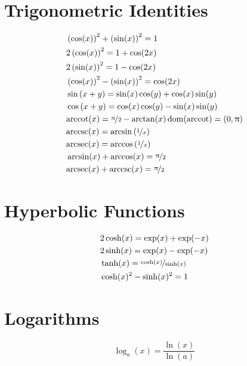 \documentclass[letterpaper,landscape,9pt,fleqn]{extarticle}
\newcommand{\dom}{\mathrm{dom}}
\newcommand{\arcsec}{\mathrm{arcsec}}
\newcommand{\arccsc}{\mathrm{arccsc}}
\newcommand{\arccot}{\mathrm{arccot}}
\begin{document}
\begin{multicols*}{4}
\section*{Trigonometric Identities}
\vspace{-0.25in}
\begin{minipage}[c]{0.25\textwidth}
\begin{align*}
  &\left(\cos(x)\right)^2 + \left(\sin(x)\right)^2 = 1 \\
  &2 \left(\cos(x)\right)^2 =  1 + \cos(2 x) \\
  &2 \left(\sin(x)\right)^2 = 1 - \cos(2 x) \\
  & \left(\cos (x)\right)^2 - \left(\sin (x) \right)^2 = \cos(2x) \\
   &\sin\left(x +  y\right) =\sin (x) \cos (y) + \cos (x) \sin (y) \\
  &\cos\left(x+y\right)=\cos (x) \cos (y) - \sin (x) \sin (y)    \\
  &\arccot(x) = \nicefrac{\uppi}{2} - \arctan(x) \, \dom(\arccot) = (0,\uppi)\\
  &\arccsc(x) = \arcsin \left (\nicefrac{1}{x} \right ) \\
  &\arcsec(x) = \arccos \left(\nicefrac{1}{x} \right) \\
  & \arcsin (x) + \arccos (x) = \nicefrac{\uppi}{2} \\
    & \arcsec (x) + \arccsc (x) = \nicefrac{\uppi}{2}
  \end{align*}
\end{minipage}

\section*{Hyperbolic Functions}
\vspace{-0.35in}
\begin{align*}
  &2 \cosh(x) = \exp(x) + \exp(-x) \\
  &2 \sinh(x) = \exp(x) - \exp(-x) \\
  & \tanh(x) = \nicefrac{\cosh(x)}{\sinh(x)}\\
  &\cosh(x)^2 - \sinh(x)^2 = 1
\end{align*}

  \section*{Logarithms}
  \vspace{-0.35in}
      \begin{equation*}
    \log_a(x) = \frac{\ln(x)}{\ln(a)}
       \end{equation*}


\end{multicols*}
\end{document}
